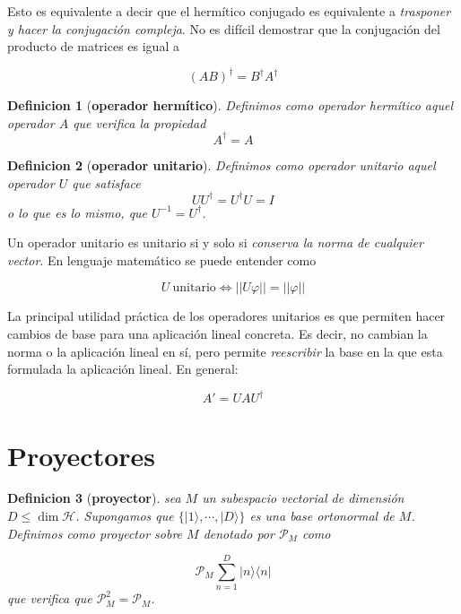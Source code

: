 \documentclass[12pt]{book}
\numberwithin{equation}{chapter}
\numberwithin{figure}{chapter}
\newtheorem{definition}{Definicion}[section]
\begin{document}
Esto es equivalente a decir que el hermítico conjugado es equivalente a \textit{trasponer y hacer la conjugación compleja}. No es difícil demostrar que la conjugación del producto de matrices es igual a

\begin{equation}
(A B)^\dagger = B^\dagger A^\dagger
\end{equation}

\begin{definition}[\textbf{operador hermítico}] 
Definimos como operador hermítico aquel operador $A$ que verifica la propiedad 
\begin{equation}
A^\dagger = A
\end{equation}
\end{definition}

\begin{definition}[\textbf{operador unitario}] 
Definimos como operador unitario aquel operador $U$ que satisface
\begin{equation}
U U^\dagger = U^\dagger U = I
\end{equation}
o lo que es lo mismo, que $U^{-1} = U^\dagger$.
\end{definition}

Un operador unitario es unitario si y solo si \textit{conserva la norma de cualquier vector}. En lenguaje matemático se puede entender como

\begin{equation}
U \ \mathrm{unitario}  \Longleftrightarrow || U \varphi || = || \varphi  ||
\end{equation}

La principal utilidad práctica de los operadores unitarios es que permiten hacer cambios de base para una aplicación lineal concreta. Es decir, no cambian la norma o la aplicación lineal en sí, pero permite \textit{reescribir} la base en la que esta formulada la aplicación lineal. En general:

\begin{equation}
A ' = U A U^\dagger
\end{equation}

\section{Proyectores}

\begin{definition}[\textbf{proyector}]
sea $M$ un subespacio vectorial de dimensión $D \leq \dim \mathcal{H}$. Supongamos que $\{ | 1 \rangle, \cdots, | D \rangle \}$ es una base ortonormal de $M$. Definimos como proyector sobre $M$ denotado por $\mathcal{P}_M$ como 

\begin{equation}
\mathcal{P}_M \sum_{n=1}^D | n \rangle \langle n |
\end{equation}
que verifica que $\mathcal{P}^2_M = \mathcal{P}_M$. 
\end{definition}
\end{document}
